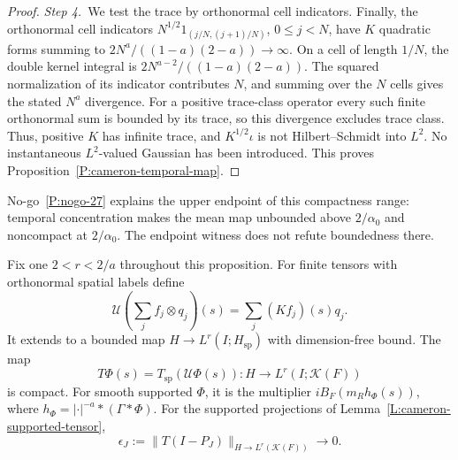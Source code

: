 \begin{proof}
  \medskip
  \noindent\textit{Step 4.~}We test the trace by orthonormal cell indicators.
  Finally, the orthonormal cell indicators $N^{1/2}1_{(j/N,(j+1)/N)}$, $0 \le j
  < N$, have $K$ quadratic forms summing to $2N^a/((1-a)(2-a)) \to \infty$.
  On a cell of length $1/N$, the double kernel integral is
  $2N^{a-2}/((1-a)(2-a))$. The squared normalization of its indicator
  contributes $N$, and summing over the $N$ cells gives the stated $N^a$
  divergence. For a positive trace-class operator every such finite
  orthonormal sum is bounded by its trace, so this divergence excludes trace
  class.
  Thus, positive $K$ has infinite trace, and $K^{1/2}\iota$ is not
  Hilbert--Schmidt into $L^2$. No instantaneous $L^2$-valued Gaussian has been
  introduced. This proves Proposition~\ref{P:cameron-temporal-map}.
\end{proof}

No-go~\ref{P:nogo-27} explains the upper endpoint of this compactness
range: temporal concentration makes the mean map unbounded above
$2/\alpha_0$ and noncompact at $2/\alpha_0$. The endpoint witness does not
refute boundedness there.

%
\begin{proposition}\label{P:cameron-full-mean}
  Fix one $2 < r < 2/a$ throughout this proposition. For finite tensors with
  orthonormal spatial labels define
  \[
    \mathcal{U}\left(\sum_j f_j\otimes q_j\right)(s)
    =\sum_j(Kf_j)(s)q_j.
  \]
  It extends to a bounded map $H \to L^r(I;H_{\mathrm{sp}})$ with dimension-free
  bound. The map
  \begin{equation}\label{E:cameron-full-mean}
    T\Phi(s)=T_{\mathrm{sp}}(\mathcal{U}\Phi(s))
    :H\longrightarrow L^r(I;\mathcal{K}(F))
  \end{equation}
  is compact. For smooth supported $\Phi$, it is the multiplier
  $iB_F(m_Rh_\Phi(s))$, where $h_\Phi = |\cdot|^{-a}*(\Gamma*\Phi)$. For the
  supported projections of Lemma~\ref{L:cameron-supported-tensor},
  \begin{equation}\label{E:cameron-compact-tail}
    \epsilon_J:=\|T(I-P_J)\|_{H\to L^r(\mathcal{K}(F))}
    \longrightarrow0.
  \end{equation}
\end{proposition}


